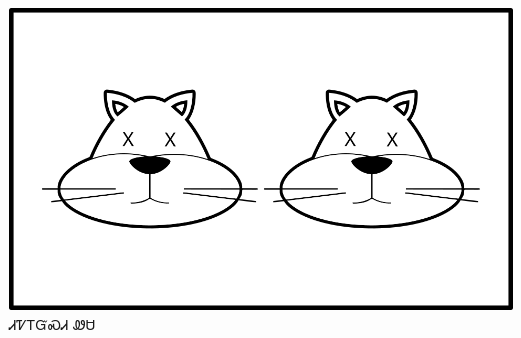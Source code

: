 \documentclass[avery5371]{flashcards}%
\begin{document}
    \begin{flashcard}{
        \includegraphics[width=0.95\columnwidth,height=.51\columnwidth,keepaspectratio]{../artwork/for-colors/wesa-tali-dead}
    }
        \Huge ᏗᏤᎢᏳᏍᏗ ᏪᏌ
    \end{flashcard}
\end{document}
